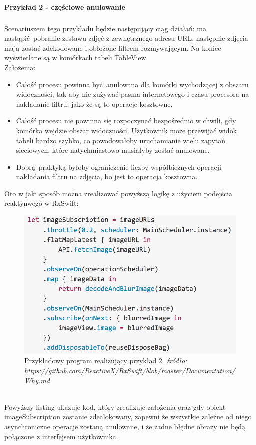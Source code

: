 \documentclass[12pt,oneside,a4paper]{report}
\begin{document}
\paragraph{Przykład 2 - częściowe anulowanie}
\subparagraph{}Scenariuszem tego przykładu będzie następujący ciąg działań: ma nastąpić pobranie zestawu zdjęć z zewnętrznego adresu URL, następnie zdjęcia mają zostać zdekodowane i obłożone filtrem rozmywającym. Na koniec wyświetlane są w komórkach tabeli TableView.\\
Założenia: 
\begin{itemize}
	\item Całość procesu powinna być anulowana dla komórki wychodzącej z obszaru widoczności, tak aby nie zużywać pasma internetowego i czasu procesora na nakładanie filtru, jako że są to operacje kosztowne.
	\item Całość procesu nie powinna się rozpoczynać bezpośrednio w chwili, gdy komórka wejdzie obszar widoczności. Użytkownik może przewijać widok tabeli bardzo szybko, co powodowałoby uruchamianie wielu zapytań sieciowych, które natychmiastowo musiałyby zostać anulowane.
	\item Dobrą praktyką byłoby ograniczenie liczby współbieżnych operacji nakładania filtru na zdjęcia, bo jest to operacja kosztowna.
\end{itemize}
Oto w jaki sposób można zrealizować powyższą logikę z użyciem podejścia reaktynwego w RxSwift: 
\begin{figure}[ht!]
	\centering
	\includegraphics[width=12cm]{compositionalDisposal}
	\caption{Przykładowy program realizujący przykład 2. 
		\textit{źródło: https://github.com/ReactiveX/RxSwift/blob/master/Documentation/Why.md}}
	\label{compositionalDisposal}
\end{figure}\\
Powyższy listing ukazuje kod, który zrealizuje założenia oraz gdy obiekt imageSubscription zostanie zdealokowany, zapewni że wszystkie zależne od niego asynchroniczne operacje zostaną anulowane, i że żadne błędne obrazy nie będą połączone z interfejsem użytkownika.
\pagebreak
\end{document}
